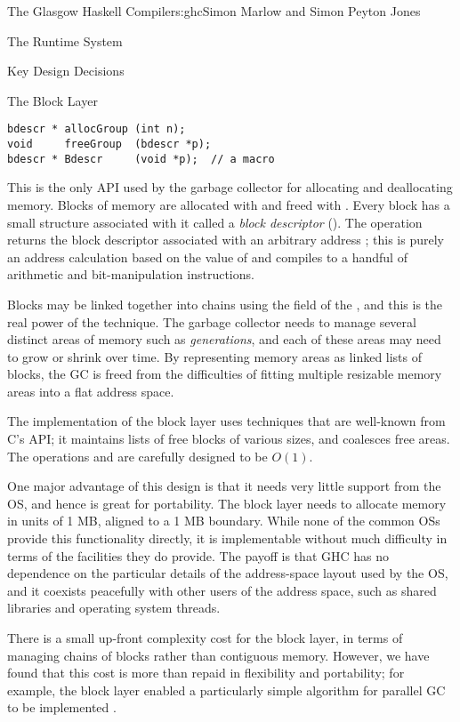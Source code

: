 \begin{aosachapter}{The Glasgow Haskell Compiler}{s:ghc}{Simon Marlow and Simon Peyton Jones}
\begin{aosasect1}{The Runtime System}
\begin{aosasect2}{Key Design Decisions}
\begin{aosasect3}{The Block Layer}
\begin{verbatim}
bdescr * allocGroup (int n);
void     freeGroup  (bdescr *p);
bdescr * Bdescr     (void *p);  // a macro
\end{verbatim}

This is the only API used by the garbage collector for allocating and
deallocating memory.  Blocks of memory are allocated with
 and freed with .  Every block has a
small structure associated with it called a \emph{block descriptor}
().  The operation  returns the block
descriptor associated with an arbitrary address ; this is
purely an address calculation based on the value of  and
compiles to a handful of arithmetic and bit-manipulation instructions.

Blocks may be linked together into chains using the  field
of the , and this is the real power of the technique.
The garbage collector needs to manage several distinct areas of memory
such as \emph{generations}, and each of these areas may need to grow
or shrink over time.  By representing memory areas as linked lists of
blocks, the GC is freed from the difficulties of fitting multiple
resizable memory areas into a flat address space.

The implementation of the block layer uses techniques that are
well-known from C's \linebreak
{} API; it maintains lists of
free blocks of various sizes, and coalesces free areas.  The
operations  and  are carefully
designed to be $O(1)$.

One major advantage of this design is that it needs very little
support from the OS, and hence is great for portability.  The block
layer needs to allocate memory in units of 1 MB, aligned to a 1 MB
boundary.  While none of the common OSs provide this functionality
directly, it is implementable without much difficulty in terms of the
facilities they do provide.  The payoff is that GHC has no dependence
on the particular details of the address-space layout used by the OS,
and it coexists peacefully with other users of the address space, such
as shared libraries and operating system threads.

There is a small up-front complexity cost for the block layer, in
terms of managing chains of blocks rather than contiguous memory.
However, we have found that this cost is more than repaid in
flexibility and portability; for example, the block layer enabled a
particularly simple algorithm for parallel GC to be implemented
\cite{bib:parallel-gc}.


\end{aosasect3}
\end{aosasect2}
\end{aosasect1}
\end{aosachapter}
